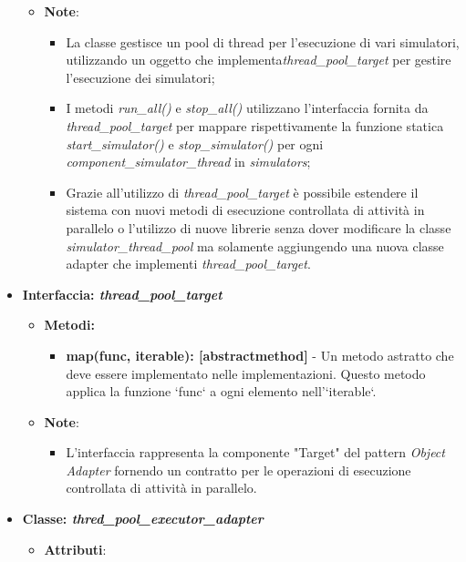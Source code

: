 \begin{itemize}
\begin{itemize}
\begin{itemize}
        \end{itemize}
        \item\textbf{Note}:
        \begin{itemize}
            \item La classe gestisce un pool di thread per l'esecuzione di vari simulatori, utilizzando un oggetto che implementa\textit{thread\_pool\_target} per gestire l'esecuzione dei simulatori;
            \item I metodi \textit{run\_all()} e \textit{stop\_all()} utilizzano l'interfaccia fornita da \textit{thread\_pool\_target} per mappare rispettivamente la funzione statica \textit{start\_simulator()} e \textit{stop\_simulator()} per ogni \textit{component\_simulator\_thread} in \textit{simulators};
            \item Grazie all'utilizzo di \textit{thread\_pool\_target} è possibile estendere il sistema con nuovi metodi di esecuzione controllata di attività in parallelo o l'utilizzo di nuove librerie senza dover modificare la classe \textit{simulator\_thread\_pool} ma solamente aggiungendo una nuova classe adapter che implementi \textit{thread\_pool\_target}.
        \end{itemize}
    \end{itemize}
    \item{\textbf{Interfaccia: \textit{thread\_pool\_target}}}
    \begin{itemize}
        \item\textbf{Metodi: }
        \begin{itemize}
            \item \textbf{map(func, iterable): [abstractmethod]} - Un metodo astratto che deve essere implementato nelle implementazioni. Questo metodo applica la funzione `func` a ogni elemento nell'`iterable`.
        \end{itemize}
        \item\textbf{Note}:
        \begin{itemize}
            \item L'interfaccia rappresenta la componente "Target" del pattern \textit{Object Adapter} fornendo un contratto per le operazioni di esecuzione controllata di attività in parallelo.
        \end{itemize}
    \end{itemize}
    \item{\textbf{Classe: \textit{thred\_pool\_executor\_adapter}}}
    \begin{itemize}
        \item\textbf{Attributi}:

\end{itemize}
\end{itemize}
